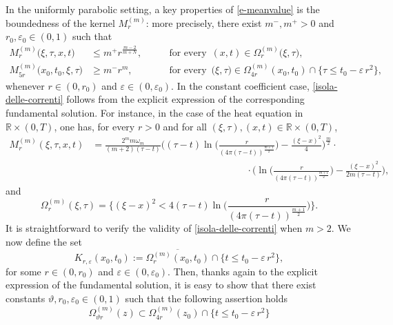 \documentclass[11pt,a4paper]{article}
\numberwithin{equation}{section}
\def \e {{\varepsilon}}
\def \t {{\tau}}
\def \x {{\xi}}
\def \O {{\Omega}}
\begin{document}
{{In the uniformly parabolic setting, a key properties of \eqref{e-meanvalue} is the boundedness of the kernel $M_r^{(m)}$: more precisely, there exist $m^-,m^+>0$ and $r_0,\e_0\in(0,1)$ such that
\begin{equation}\label{isola-delle-correnti}
	\begin{aligned}
		M_{r}^{(m)} \big(\x,\t,x,t\big) &\leq m^+r^{\frac{m-2}{m+N}},\qquad   &\text{for every } \, (x,t)\in \O^{(m)}_{r}\big(\x, \t\big),\\ M_{5r}^{(m)} \big(x_0,t_0,\x,\t\big) &\geq m^- r^m,\qquad &\text{for every } \,\big(\x,\t\big)\in  \O^{(m)}_{4r}(x_0, t_0)\cap \Big\{\t\leq t_0 - \e\,r^2\Big\},
	\end{aligned}
\end{equation}
whenever $r \in (0,r_0)$ and $\e \in (0, \e_0)$. In the constant coefficient case, \eqref{isola-delle-correnti} follows from the explicit expression of the corresponding fundamental solution. For instance, in the case of the heat equation in $\mathbb{R} \times (0,T)$, one has, for every $r> 0$ and for all $(\xi, \tau), (x, t) \in \mathbb{R} \times (0,T)$,
\begin{equation}
	\begin{aligned}
		M^{(m)}_r(\x,\t,x,t)&=\frac{2^m m \omega_m}{(m+2)(\t-t)}\Bigg((\t-t)\ln\Bigg(\frac{r}{(4\pi(\t-t))^\frac{m+1}{2}}\Bigg)-\frac{(\x-x)^2}{4}\Bigg)^\frac{m}{2}\cdot\\
		&\qquad \qquad \qquad \qquad\qquad \qquad \qquad \qquad\cdot\Bigg(\ln\Bigg(\frac{r}{(4\pi(\t-t))^\frac{m+1}{2}}\Bigg)-\frac{(\x-x)^2}{2m(\t-t)}\Bigg),
	\end{aligned}
\end{equation}
and
\begin{equation}
	\O^{(m)}_r(\x,\t)=\Bigg\{(\x-x)^2< 4(\t-t)\ln\Bigg(\frac{r}{(4\pi(\t-t))^\frac{m+1}{2}}\Bigg)\Bigg\}.
\end{equation}
It is straightforward to verify the validity of \eqref{isola-delle-correnti} when $m>2$. We now define the set
\begin{equation}
	K_{r,\e	}(x_0,t_0):=\overline{\O^{(m)}_r(x_0,t_0)}\cap \Big\{t\leq t_0 - \e\, r^2\Big\},
\end{equation}
for some $r \in (0,r_0)$ and $\e \in (0, \e_0)$. Then, thanks again to the explicit expression of the fundamental solution, it is easy to show that there exist constants $\vartheta, r_0,\e_0 \in (0,1)$ such that the following assertion holds 
\begin{equation}\label{eq:inclusione-pesante}
\O^{(m)}_{\vartheta r}(z) \subset \O^{(m)}_{4 r}(z_0) \cap \Big\{t\leq t_0 - \e\, r^2\Big\}

\end{equation}}}
\end{document}
